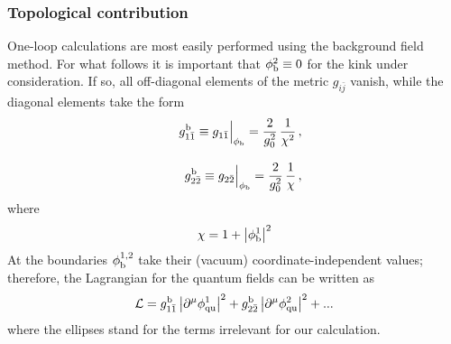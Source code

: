 \documentclass[epsfig,12pt]{article}
\def\beq{\begin{equation}}
\def\eeq{\end{equation}}
\def\beq{\begin{equation}}
\def\eeq{\end{equation}}
\begin{document}
\subsubsection{Topological contribution}

	One-loop calculations are most easily performed using the background field method.
	For what follows it is important that $\phi^2_{\rm b}\equiv 0$ for the kink under consideration.
	If so, all off-diagonal elements of the metric $g_{i\bar j}$ vanish, while the diagonal elements take the form
\begin{eqnarray}
&&
g_{1\bar 1}^{\rm b} \equiv g_{1\bar 1}\Big|_{\phi_{\rm b}} = \frac{2}{g_0^2}\,\frac {1}{\chi^2}\,,\nonumber\\[3mm]
&&
g_{2\bar 2}^{\rm b} \equiv 
g_{2\bar 2}\Big|_{\phi_{\rm b}} = \frac{2}{g_0^2}\,\frac {1}{\chi}\,,
\end{eqnarray}
where
\beq
\chi = 1 + \left| \phi^1_{\rm b}
\right|^2
\eeq
	At the boundaries $\phi_{\rm b}^{1,2}$ take their (vacuum) coordinate-independent values;
	therefore, the Lagrangian for the quantum fields can be written as
\beq
\mathcal{L}= g_{1\bar 1}^{\rm b} \left| \partial^\mu \phi^1_{\rm qu}\right|^2+
g_{2\bar 2}^{\rm b} \left| \partial^\mu \phi^2_{\rm qu}\right|^2 + ...
\label{324}
\eeq
	where the ellipses stand for the terms irrelevant for our calculation.
\end{document}
